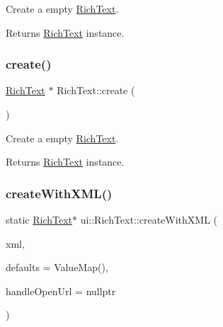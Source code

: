 Create a empty \hyperlink{classui_1_1RichText}{Rich\+Text}. 

\begin{DoxyReturn}{Returns}
\hyperlink{classui_1_1RichText}{Rich\+Text} instance. 
\end{DoxyReturn}
\mbox{\label{classui_1_1RichText_a67dbc7d118c0f02c9598221a3bceaf20}} 
\subsubsection{\texorpdfstring{create()}{create()}\hspace{0.1cm}{\footnotesize\ttfamily [2/2]}}
{\footnotesize\ttfamily \hyperlink{classui_1_1RichText}{Rich\+Text} $\ast$ Rich\+Text\+::create (\begin{DoxyParamCaption}\item[{void}]{ }\end{DoxyParamCaption})\hspace{0.3cm}{\ttfamily [static]}}



Create a empty \hyperlink{classui_1_1RichText}{Rich\+Text}. 

\begin{DoxyReturn}{Returns}
\hyperlink{classui_1_1RichText}{Rich\+Text} instance. 
\end{DoxyReturn}
\mbox{\label{classui_1_1RichText_a90c6d73c16d60b0f32308edb67415116}} 
\subsubsection{\texorpdfstring{create\+With\+X\+M\+L()}{createWithXML()}\hspace{0.1cm}{\footnotesize\ttfamily [1/2]}}
{\footnotesize\ttfamily static \hyperlink{classui_1_1RichText}{Rich\+Text}$\ast$ ui\+::\+Rich\+Text\+::create\+With\+X\+ML (\begin{DoxyParamCaption}\item[{const std\+::string \&}]{xml,  }\item[{const Value\+Map \&}]{defaults = {\ttfamily ValueMap()},  }\item[{const \hyperlink{classui_1_1RichText_ad3631ae61d204f1d9576f5923bbd762e}{Open\+Url\+Handler} \&}]{handle\+Open\+Url = {\ttfamily nullptr} }\end{DoxyParamCaption})\hspace{0.3cm}{\ttfamily [static]}}



